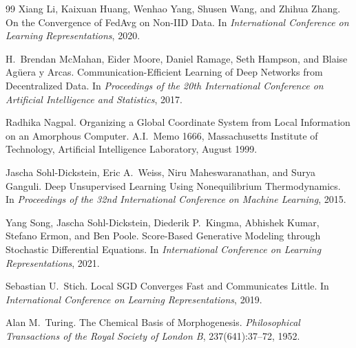 \documentclass[11pt]{article}
\theoremstyle{definition}
\theoremstyle{plain}
\theoremstyle{remark}
\begin{document}
\begin{thebibliography}{99}
Xiang Li, Kaixuan Huang, Wenhao Yang, Shusen Wang, and Zhihua Zhang.
On the Convergence of FedAvg on Non-IID Data.
In \emph{International Conference on Learning Representations}, 2020.

H.\ Brendan McMahan, Eider Moore, Daniel Ramage, Seth Hampson, and Blaise Ag\"uera y Arcas.
Communication-Efficient Learning of Deep Networks from Decentralized Data.
In \emph{Proceedings of the 20th International Conference on Artificial Intelligence and Statistics}, 2017.

Radhika Nagpal.
Organizing a Global Coordinate System from Local Information on an Amorphous Computer.
A.I.\ Memo 1666, Massachusetts Institute of Technology, Artificial Intelligence Laboratory, August 1999.

Jascha Sohl-Dickstein, Eric A.\ Weiss, Niru Maheswaranathan, and Surya Ganguli.
Deep Unsupervised Learning Using Nonequilibrium Thermodynamics.
In \emph{Proceedings of the 32nd International Conference on Machine Learning}, 2015.

Yang Song, Jascha Sohl-Dickstein, Diederik P.\ Kingma, Abhishek Kumar, Stefano Ermon, and Ben Poole.
Score-Based Generative Modeling through Stochastic Differential Equations.
In \emph{International Conference on Learning Representations}, 2021.

Sebastian U.\ Stich.
Local SGD Converges Fast and Communicates Little.
In \emph{International Conference on Learning Representations}, 2019.

Alan M.\ Turing.
The Chemical Basis of Morphogenesis.
\emph{Philosophical Transactions of the Royal Society of London B}, 237(641):37--72, 1952.

\end{thebibliography}
\end{document}
